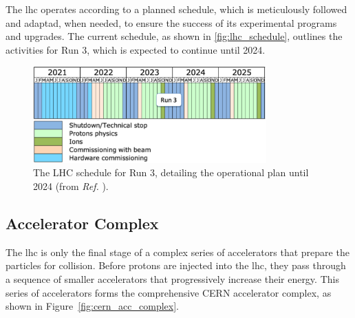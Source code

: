 
The \acrshort{lhc} operates according to a planned schedule, which is meticulously followed and adaptad, when needed, to ensure the success of its experimental programs and upgrades. The current schedule, as shown in \autoref{fig:lhc_schedule}, outlines the activities for Run 3, which is expected to continue until 2024.


\begin{figure}[!htb]
    \centering
    \includegraphics[width=0.8\textwidth]{images/assets/lhc_schedule.png}
    \caption[LHC Run 3 schedule]{The LHC schedule for Run 3, detailing the operational plan until 2024 (from \textit{Ref.} \cite{LHCSchedule}).}
    \label{fig:lhc_schedule}
\end{figure}

\subsection{Accelerator Complex}
\label{subsec:acc_complex}


The \acrshort{lhc} is only the final stage of a complex series of accelerators that prepare the particles for collision. Before protons are injected into the \acrshort{lhc}, they pass through a sequence of smaller accelerators that progressively increase their energy. This series of accelerators forms the comprehensive CERN accelerator complex, as shown in Figure~\ref{fig:cern_acc_complex}.

